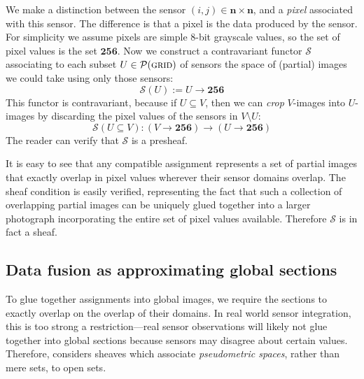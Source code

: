 We make a distinction between the sensor $(i, j) \in \mathbf{n} \times \mathbf{n}$, and a \emph{pixel} associated with this sensor. The difference is that a pixel is the data produced by the sensor. For simplicity we assume pixels are simple 8-bit grayscale values, so the set of pixel values is the set $\mathbf{256}$. Now we construct a contravariant functor $\mathcal{S}$ associating to each subset $U \in \mathcal{P}(\textsc{grid})$ of sensors the space of (partial) images we could take using only those sensors:
\[\mathcal{S}(U) := U \to \mathbf{256}
\]
This functor is contravariant, because if $U \subseteq V$, then we can \emph{crop} $V$-images into $U$-images by discarding the pixel values of the sensors in $V \setminus U$:
\[ \mathcal{S}\left(U \subseteq V \right) : \left(V \to \mathbf{256}\right) \to \left(U \to \mathbf{256}\right)\]
The reader can verify that $\mathcal{S}$ is a presheaf.

It is easy to see that any compatible assignment represents a set of partial images that exactly overlap in pixel values wherever their sensor domains overlap. The sheaf condition is easily verified, representing the fact that such a collection of overlapping partial images can be uniquely glued together into a larger photograph incorporating the entire set of pixel values available. Therefore $\mathcal{S}$ is in fact a sheaf.


\subsection{Data fusion as approximating global sections}

To glue together assignments into global images, we require the sections to exactly overlap on the overlap of their domains. In real world sensor integration, this is too strong a restriction---real sensor observations will likely not glue together into global sections because sensors may disagree about certain values. Therefore, \cite{2017robinsonCanonical} considers sheaves which associate \emph{pseudometric spaces}, rather than mere sets, to open sets.

